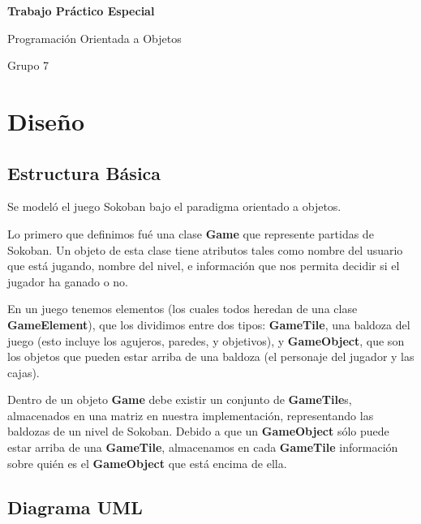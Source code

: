 \documentclass[a4paper,12pt,titlepage]{article}
\begin{document}
\begin{center}

\begin{huge}
	\textbf{Trabajo Práctico Especial} 
\end{huge}

\vspace{20pt}

\begin{Huge}
	Programación Orientada a Objetos
\end{Huge}

\vspace{12pt}

\begin{large}
	Grupo 7
\end{large}

\end{center}

\section{Diseño}

\subsection{Estructura Básica}

Se modeló el juego Sokoban bajo el paradigma orientado a objetos.

Lo primero que definimos fué una clase \textbf{Game} que represente partidas de Sokoban. Un objeto de esta clase tiene atributos tales como nombre del usuario que está jugando, nombre del nivel, e información que nos permita decidir si el jugador ha ganado o no.

En un juego tenemos elementos (los cuales todos heredan de una clase \textbf{GameElement}), que los dividimos entre dos tipos: \textbf{GameTile}, una baldoza del juego (esto incluye los agujeros, paredes, y objetivos), y \textbf{GameObject}, que son los objetos que pueden estar arriba de una baldoza (el personaje del jugador y las cajas).

Dentro de un objeto \textbf{Game} debe existir un conjunto de \textbf{GameTile}s, almacenados en una matriz en nuestra implementación, representando las baldozas de un nivel de Sokoban. Debido a que un \textbf{GameObject} sólo puede estar arriba de una \textbf{GameTile}, almacenamos en cada \textbf{GameTile} información sobre quién es el \textbf{GameObject} que está encima de ella.

\newpage
\subsection{Diagrama UML}
\end{document}
